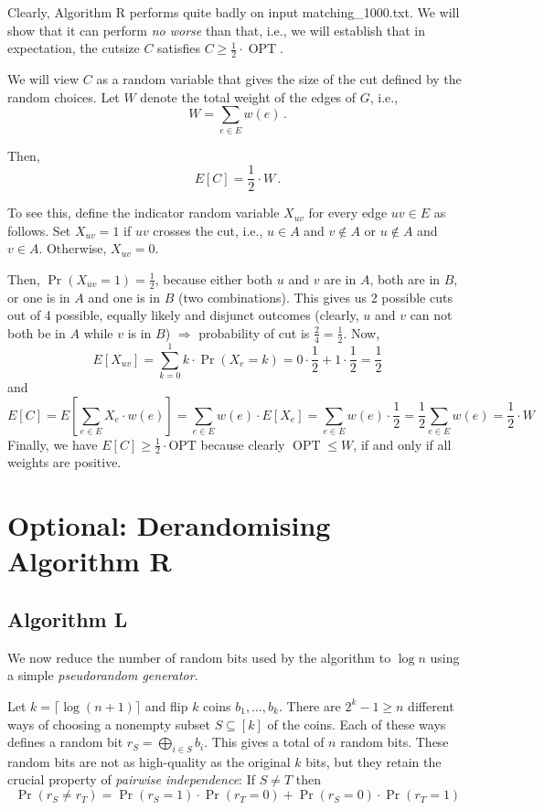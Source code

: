 \documentclass{tufte-handout}
\begin{document}
Clearly, Algorithm R performs quite badly on input 
  matching\_1000.txt.
We will show that it can perform \emph{no worse} than that, i.e., we
will establish that in expectation, the cutsize $C$ satisfies $C \geq
\frac{1}{2}\cdot \operatorname{OPT}$.


We will view $C$ as a random variable that gives the size of the cut
defined by the random choices.
Let $W$ denote the total weight of the edges of $G$, i.e.,
\[ W= \sum_{e\in E} w(e)\,.\]

Then,
$$
E[C] = \textstyle\frac{1}{2}\cdot W\,.
$$

To see this, define the indicator random variable $X_{uv}$ for every
edge $uv\in E$ as follows.
Set $X_{uv}=1$ if $uv$ crosses the cut, i.e., $u\in A$ and $v\notin A$
or $u\notin A$ and $v\in A$.
Otherwise, $X_{uv} = 0$.

Then, $\Pr(X_{uv} = 1) =  \frac{1}{2}$, because either both $u$ and $v$ are in $A$, both are in $B$, or one is in $A$ and one is in $B$ (two combinations). This gives us 2 possible cuts out of 4 possible, equally likely and disjunct outcomes (clearly, $u$ and $v$ can not both be in $A$ while $v$ is in $B$) $\Rightarrow $ probability of cut is $\frac{2}{4} = \frac{1}{2}$.
Now, $$E[X_{uv}] = \sum_{k=0}^1k\cdot\Pr(X_{e} = k) = 0\cdot\frac{1}{2} + 1\cdot\frac{1}{2} = \frac{1}{2}$$
and
$$E[C]= E[\sum_{e\in E}X_{e}\cdot w(e)] = \sum_{e\in E}w(e)\cdot E[X_{e}] = \sum_{e\in E}w(e) \cdot \frac{1}{2} = \frac{1}{2}\sum_{e\in E}w(e) = \frac{1}{2}\cdot W$$ Finally, we have 
\(E[C]\geq \frac{1}{2}\cdot \text{OPT}\) because clearly
$\operatorname{OPT} \leq W$, if and only if all weights are positive.


\newpage
\section{Optional: Derandomising Algorithm R}

\subsection{Algorithm L} 


We now reduce the number of random bits used by the algorithm to $\log
n$ using a simple \emph{pseudorandom generator}.


Let $k=\lceil\log (n+1)\rceil$ and flip $k$ coins $b_1,\ldots, b_k$.
There are $2^k -1 \geq n$ different ways of choosing a nonempty subset
$S\subseteq [k]$ of the coins.
Each of these ways defines a random bit $r_S =\bigoplus_{i\in S} b_i$.
This gives a total of $n$ random bits.
These random bits are not as high-quality as the original $k$ bits,
but they retain the crucial property of \emph{pairwise independence}:
If $S\neq T$ then 
$$ \Pr(r_S\neq r_T) = \Pr(r_S=1)\cdot\Pr(r_T=0)+\Pr(r_S=0)\cdot\Pr(r_T=1)$$
\end{document}
